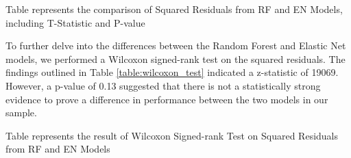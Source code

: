 \documentclass[11pt]{article}
\begin{document}
\begin{table}[h]
\caption{Comparison of Squared Residuals from RF and EN Models}
\label{table:comp_residuals}
\begin{threeparttable}
\renewcommand{\TPTminimum}{\linewidth}
\begin{tablenotes}
\footnotesize
\item Table represents the comparison of Squared Residuals from RF and EN Models, including T-Statistic and P-value
\end{tablenotes}
\end{threeparttable}
\end{table}


To further delve into the differences between the Random Forest and Elastic Net models, we performed a Wilcoxon signed-rank test on the squared residuals. The findings outlined in Table {}\ref{table:wilcoxon_test} indicated a z-statistic of 19069. However, a p-value of 0.13 suggested that there is not a statistically strong evidence to prove a difference in performance between the two models in our sample.

\begin{table}[h]
\caption{Wilcoxon Signed-rank Test on Squared Residuals from RF and EN Models}
\label{table:wilcoxon_test}
\begin{threeparttable}
\renewcommand{\TPTminimum}{\linewidth}
\begin{tablenotes}
\footnotesize
\item Table represents the result of Wilcoxon Signed-rank Test on Squared Residuals from RF and EN Models
\end{tablenotes}
\end{threeparttable}
\end{table}
\end{document}
